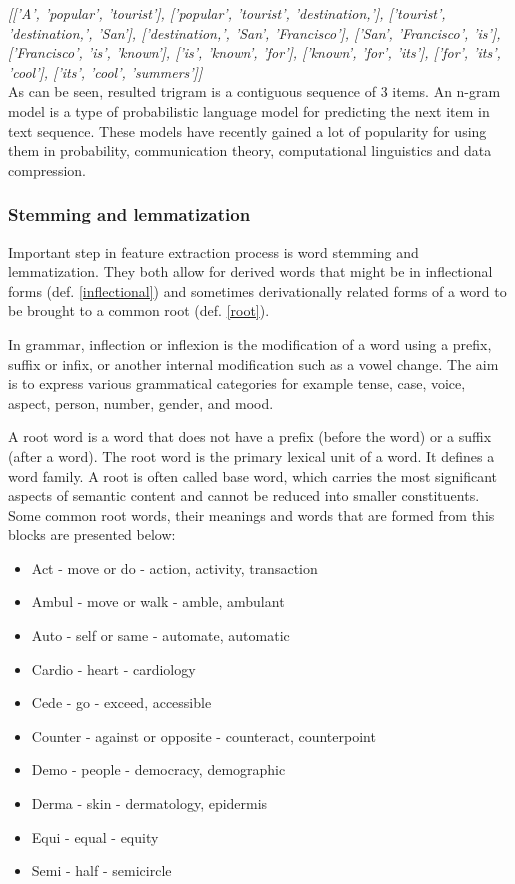 \textit{[['A', 'popular', 'tourist'], ['popular', 'tourist', 'destination,'], ['tourist', 'destination,', 'San'], ['destination,', 'San', 'Francisco'], ['San', 'Francisco', 'is'], ['Francisco', 'is', 'known'], ['is', 'known', 'for'], ['known', 'for', 'its'], ['for', 'its', 'cool'], ['its', 'cool', 'summers']]}\\

As can be seen, resulted trigram is a contiguous sequence of 3 items. An n-gram model is a type of probabilistic language model for predicting the next item in text sequence. These models have recently gained a lot of popularity for using them in probability, communication theory, computational linguistics and data compression.

\subsubsection{Stemming and lemmatization}
Important step in feature extraction process is word stemming and lemmatization. They both allow for derived words that might be in inflectional forms (def. \ref{inflectional}) and sometimes derivationally related forms of a word to be brought to a common root (def. \ref{root}). 

 \begin{definition}
 	\label{inflectional}
In grammar, inflection or inflexion is the modification of a word using a prefix, suffix or infix, or another internal modification such as a vowel change. The aim is to express various grammatical categories for example tense, case, voice, aspect, person, number, gender, and mood. 
\end{definition}

 \begin{definition}
 	\label{root}
A root word is a word that does not have a prefix (before the word) or a suffix (after a word). The root word is the primary lexical unit of a word. It defines a word family. A root is often called base word, which carries the most significant aspects of semantic content and cannot be reduced into smaller constituents. 
Some common root words, their meanings and words that are formed from this blocks are presented below:
\begin{itemize}
	\item Act  - move or do - action, activity, transaction
	\item Ambul -  move or walk - amble, ambulant
	\item Auto -  self or same -  automate, automatic
	\item Cardio -  heart - cardiology
	\item Cede -  go -  exceed, accessible
	\item Counter -  against or opposite - counteract, counterpoint 
	\item Demo -  people - democracy, demographic
	\item Derma -  skin - dermatology, epidermis
	\item Equi -  equal - equity
	\item Semi -  half - semicircle 
\end{itemize}
\end{definition}


